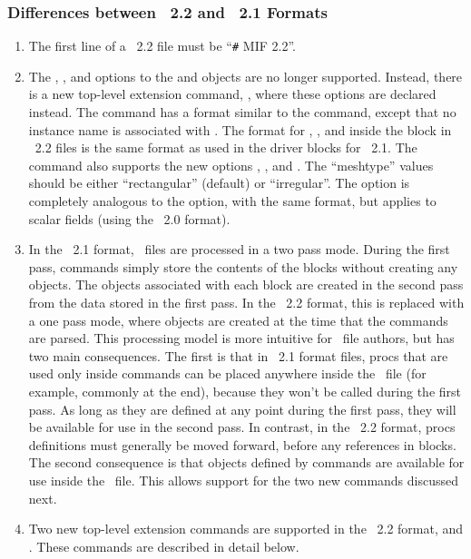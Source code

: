 \subsubsection{Differences between \MIF~2.2 and \MIF~2.1 Formats}\label{sec:mif22diffs}
\begin{enumerate}
\item The first line of a \MIF~2.2 file must be ``\verb+#+ MIF 2.2''.
\item The , , and
  options to the 
 and  objects are no longer supported.  Instead,
 there is a new top-level extension command, , where
 these options are declared instead.  The  command has a
 format similar to the  command, except that no instance
 name is associated with .  The format for ,
 , and 
 inside the  block in \MIF~2.2 files is the same format
 as used in the driver  blocks for \MIF~2.1.  The
  command also supports the new options
 ,
 , and
 .  The ``meshtype'' values should
 be either ``rectangular'' (default) or ``irregular''.  The
  option is completely analogous to
 the  option, with the same format,
 but applies to scalar fields (using the \OVF~2.0 format).
\item In the \MIF~2.1 format, \MIF\ files are
 processed in a two pass mode.  During the first pass, 
 commands simply store the contents of the  blocks without
 creating any  objects.  The  objects
 associated with each  block are created in the second pass
 from the data stored in the first pass.  In the \MIF~2.2 format, this is
 replaced with a one pass mode, where  objects are created
 at the time that the  commands are parsed.  This processing
 model is more intuitive for \MIF\ file authors, but has two main
 consequences.  The first is that in \MIF~2.1 format files, \Tcl procs that
 are used only inside  commands can be placed anywhere inside
 the \MIF\ file (for example, commonly at the end), because they won't be
 called during the first pass.  As long as they are defined at any point
 during the first pass, they will be available for use in the second
 pass.  In contrast, in the \MIF~2.2 format, \Tcl procs definitions must
 generally be moved forward, before any references in 
 blocks.  The second consequence is that  objects defined by
  commands are available for use inside the \MIF\ file.  This
 allows support for the two new commands discussed next.
\item Two new top-level extension commands are supported in the \MIF~2.2
 format,  and .  These commands
 are described in detail below.
\end{enumerate}

